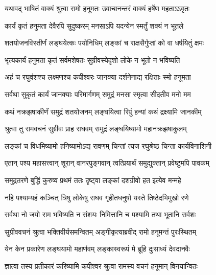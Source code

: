 



\twolineshloka
{यथावद् भाषितं वाक्यं श्रुत्वा रामो हनूमतः}
{उवाचानन्तरं वाक्यं हर्षेण महताऽऽवृतः} %

\twolineshloka
{कार्यं कृतं हनुमता देवैरपि सुदुष्करम्}
{मनसाऽपि यदन्येन स्मर्तुं शक्यं न भूतले} %

\twolineshloka
{शतयोजनविस्तीर्णं लङ्घयेत्कः पयोनिधिम्}
{लङ्कां च राक्षसैर्गुप्तां को वा धर्षयितुं क्षमः} %

\twolineshloka
{भृत्यकार्यं हनुमता कृतं सर्वमशेषतः}
{सुग्रीवस्येदृशो लोके न भूतो न भविष्यति} %

\twolineshloka
{अहं च रघुवंशश्च लक्ष्मणश्च कपीश्वरः}
{जानक्या दर्शनेनाद्य रक्षिताः स्मो हनूमता} %

\twolineshloka
{सर्वथा सुकृतं कार्यं जानक्याः परिमार्गणम्}
{समुद्रं मनसा स्मृत्वा सीदतीव मनो मम} %

\twolineshloka
{कथं नक्रझषाकीर्णं समुद्रं शतयोजनम्}
{लङ्घयित्वा रिपुं हन्यां कथं द्रक्ष्यामि जानकीम्} %

\twolineshloka
{श्रुत्वा तु रामवचनं सुग्रीवः प्राह राघवम्}
{समुद्रं लङ्घयिष्यामो महानक्रझषाकुलम्} %

\twolineshloka
{लङ्कां च विधमिष्यामो हनिष्यामोऽद्य रावणम्}
{चिन्तां त्यज रघुश्रेष्ठ चिन्ता कार्यविनाशिनी} %

\twolineshloka
{एतान् पश्य महासत्त्वान् शूरान् वानरपुङ्गवान्}
{त्वत्प्रियार्थं समुद्युक्तान् प्रवेष्टुमपि पावकम्} %

\twolineshloka
{समुद्रतरणे बुद्धिं कुरुष्व प्रथमं ततः}
{दृष्ट्वा लङ्कां दशग्रीवो हत इत्येव मन्महे} %

\twolineshloka
{नहि पश्याम्यहं कञ्चित् त्रिषु लोकेषु राघव}
{गृहीतधनुषो यस्ते तिष्ठेदभिमुखो रणे} %

\twolineshloka
{सर्वथा नो जयो राम भविष्यति न संशयः}
{निमित्तानि च पश्यामि तथा भूतानि सर्वशः} %

\twolineshloka
{सुग्रीववचनं श्रुत्वा भक्तिवीर्यसमन्वितम्}
{अङ्गीकृत्याब्रवीद् रामो हनूमन्तं पुरःस्थितम्} %

\twolineshloka
{येन केन प्रकारेण लङ्घयामो महार्णवम्}
{लङ्कास्वरूपं मे ब्रूहि दुःसाध्यं देवदानवैः} %

\twolineshloka
{ज्ञात्वा तस्य प्रतीकारं करिष्यामि कपीश्वर}
{श्रुत्वा रामस्य वचनं हनूमान् विनयान्वितः} %

